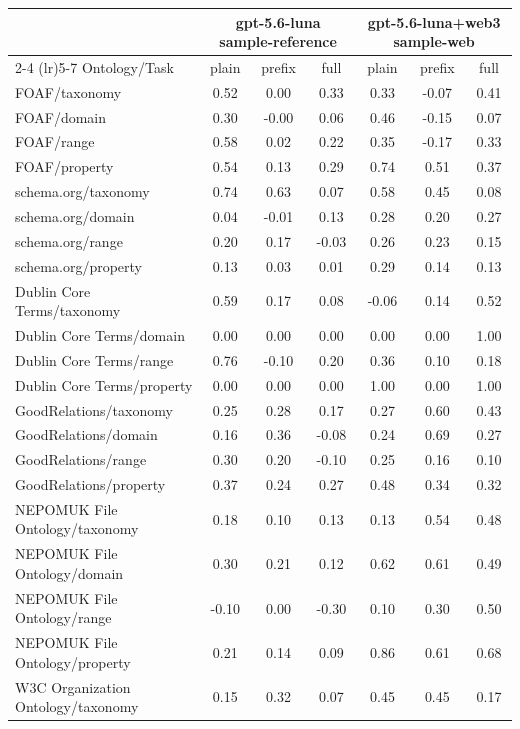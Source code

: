 \begin{tabular}{lcccccc}
\toprule
 & \multicolumn{3}{c}{gpt-5.6-luna sample-reference} & \multicolumn{3}{c}{gpt-5.6-luna+web3 sample-web} \\
\cmidrule(lr){2-4} \cmidrule(lr){5-7}
Ontology/Task & plain & prefix & full & plain & prefix & full \\
\midrule
FOAF/taxonomy & 0.52 & 0.00 & 0.33 & 0.33 & -0.07 & 0.41 \\
FOAF/domain & 0.30 & -0.00 & 0.06 & 0.46 & -0.15 & 0.07 \\
FOAF/range & 0.58 & 0.02 & 0.22 & 0.35 & -0.17 & 0.33 \\
FOAF/property & 0.54 & 0.13 & 0.29 & 0.74 & 0.51 & 0.37 \\
schema.org/taxonomy & 0.74 & 0.63 & 0.07 & 0.58 & 0.45 & 0.08 \\
schema.org/domain & 0.04 & -0.01 & 0.13 & 0.28 & 0.20 & 0.27 \\
schema.org/range & 0.20 & 0.17 & -0.03 & 0.26 & 0.23 & 0.15 \\
schema.org/property & 0.13 & 0.03 & 0.01 & 0.29 & 0.14 & 0.13 \\
Dublin Core Terms/taxonomy & 0.59 & 0.17 & 0.08 & -0.06 & 0.14 & 0.52 \\
Dublin Core Terms/domain & 0.00 & 0.00 & 0.00 & 0.00 & 0.00 & 1.00 \\
Dublin Core Terms/range & 0.76 & -0.10 & 0.20 & 0.36 & 0.10 & 0.18 \\
Dublin Core Terms/property & 0.00 & 0.00 & 0.00 & 1.00 & 0.00 & 1.00 \\
GoodRelations/taxonomy & 0.25 & 0.28 & 0.17 & 0.27 & 0.60 & 0.43 \\
GoodRelations/domain & 0.16 & 0.36 & -0.08 & 0.24 & 0.69 & 0.27 \\
GoodRelations/range & 0.30 & 0.20 & -0.10 & 0.25 & 0.16 & 0.10 \\
GoodRelations/property & 0.37 & 0.24 & 0.27 & 0.48 & 0.34 & 0.32 \\
NEPOMUK File Ontology/taxonomy & 0.18 & 0.10 & 0.13 & 0.13 & 0.54 & 0.48 \\
NEPOMUK File Ontology/domain & 0.30 & 0.21 & 0.12 & 0.62 & 0.61 & 0.49 \\
NEPOMUK File Ontology/range & -0.10 & 0.00 & -0.30 & 0.10 & 0.30 & 0.50 \\
NEPOMUK File Ontology/property & 0.21 & 0.14 & 0.09 & 0.86 & 0.61 & 0.68 \\
W3C Organization Ontology/taxonomy & 0.15 & 0.32 & 0.07 & 0.45 & 0.45 & 0.17 \\

\end{tabular}

